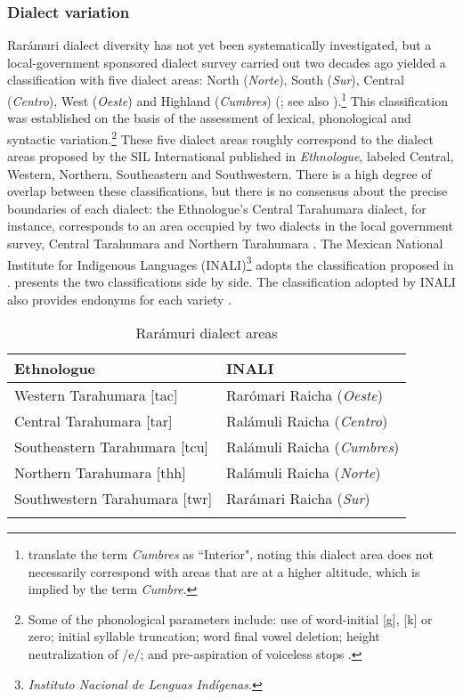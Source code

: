 \subsubsection{Dialect variation}
\label{subsubsec: dialect variation}

Rarámuri dialect diversity has not yet been systematically investigated, but a local-government sponsored dialect survey carried out two decades ago yielded a classification with five dialect areas: North (\textit{Norte}), South (\textit{Sur}), Central (\textit{Centro}), West (\textit{Oeste}) and Highland (\textit{Cumbres}) (\cite{valinas2001lengua}; see also \citet{catalogo2021inali}).\footnote{\citet{merrill2014ralamuli} translate the term \textit{Cumbres} as ``Interior", noting this dialect area does not necessarily correspond with areas that are at a higher altitude, which is implied by the term \textit{Cumbre}.} This classification was established on the basis of the assessment of lexical, phonological and syntactic variation.\footnote{Some of the phonological parameters include: use of word-initial [g], [k] or zero; initial syllable truncation; word final vowel deletion; height neutralization of /e/; and pre-aspiration of voiceless stops \citep[122]{valinas2001lengua}.} These five dialect areas roughly correspond to the dialect areas proposed by the SIL International published in \textit{Ethnologue}, labeled Central, Western, Northern, Southeastern and Southwestern. There is a high degree of overlap between these classifications, but there is no consensus about the precise boundaries of each dialect: the Ethnologue’s Central Tarahumara dialect, for instance, corresponds to an area occupied by two dialects in the local government survey, Central Tarahumara and Northern Tarahumara \citep{valinas2001lengua}. The Mexican National Institute for Indigenous Languages (INALI)\footnote{\textit{Instituto Nacional de Lenguas Indígenas}.} adopts the classification proposed in \citet{valinas2001lengua}.  presents the two classifications side by side. The classification adopted by INALI also provides endonyms for each variety \citep{catalogo2021inali}.


\begin{table}
\caption{Rarámuri dialect areas}
\label{tab:dialect}

\begin{tabularx}{\textwidth}{Xl}
\lsptoprule
\textbf{Ethnologue} & \textbf{INALI}\\
\midrule
{Western Tarahumara} [tac] & Rarómari Raicha (\textit{Oeste})\\
Central Tarahumara [tar] & Ralámuli Raicha (\textit{Centro})\\
{Southeastern Tarahumara} [tcu] & Ralámuli Raicha (\textit{Cumbres})\\
Northern Tarahumara [thh] & Ralámuli Raicha (\textit{Norte})\\
{Southwestern Tarahumara} [twr] & Rarámari Raicha (\textit{Sur})\\
\lspbottomrule
\end{tabularx}
\end{table}

